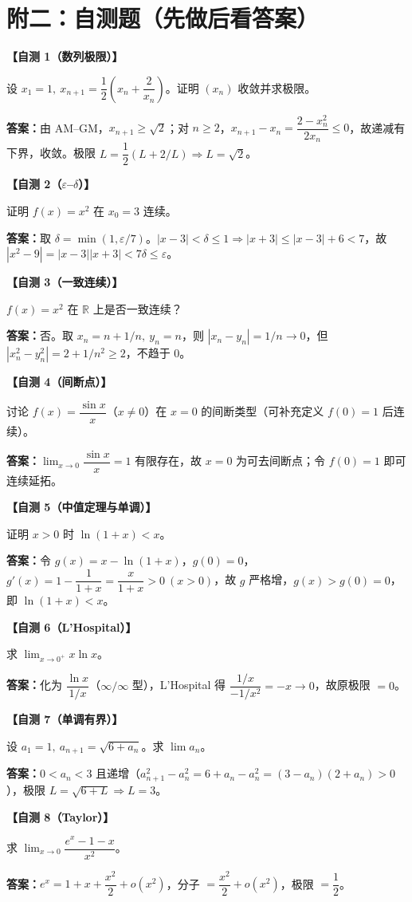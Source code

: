 \documentclass[12pt,a4paper,UTF8]{ctexart}
\newcommand{\R}{\mathbb R}
\newcommand{\eps}{\varepsilon}
\newenvironment{kp}[1]{\par\smallskip\noindent\textbf{【#1】}\par\nobreak\smallskip}{\par\smallskip}
\begin{document}
\newpage
\section*{附二：自测题（先做后看答案）}

\begin{kp}{自测 1（数列极限）}
设 $x_1=1,\ x_{n+1}=\dfrac{1}{2}\left(x_n+\dfrac{2}{x_n}\right)$。证明 $(x_n)$ 收敛并求极限。
\par\medskip
\textbf{答案：}由 AM--GM，$x_{n+1}\ge\sqrt2$；对 $n\ge2$，$x_{n+1}-x_n=\dfrac{2-x_n^2}{2x_n}\le0$，故递减有下界，收敛。极限 $L=\dfrac12(L+2/L)\Rightarrow L=\sqrt2$。
\end{kp}

\begin{kp}{自测 2（$\eps$–$\delta$）}
证明 $f(x)=x^2$ 在 $x_0=3$ 连续。
\par\medskip
\textbf{答案：}取 $\delta=\min(1,\eps/7)$。$|x-3|<\delta\le1\Rightarrow|x+3|\le|x-3|+6<7$，故 $|x^2-9|=|x-3||x+3|<7\delta\le\eps$。
\end{kp}

\begin{kp}{自测 3（一致连续）}
$f(x)=x^2$ 在 $\R$ 上是否一致连续？
\par\medskip
\textbf{答案：}否。取 $x_n=n+1/n,\ y_n=n$，则 $|x_n-y_n|=1/n\to0$，但 $|x_n^2-y_n^2|=2+1/n^2\ge2$，不趋于 0。
\end{kp}

\begin{kp}{自测 4（间断点）}
讨论 $f(x)=\dfrac{\sin x}{x}$（$x\ne0$）在 $x=0$ 的间断类型（可补充定义 $f(0)=1$ 后连续）。
\par\medskip
\textbf{答案：}$\lim_{x\to0}\dfrac{\sin x}{x}=1$ 有限存在，故 $x=0$ 为可去间断点；令 $f(0)=1$ 即可连续延拓。
\end{kp}

\begin{kp}{自测 5（中值定理与单调）}
证明 $x>0$ 时 $\ln(1+x)<x$。
\par\medskip
\textbf{答案：}令 $g(x)=x-\ln(1+x)$，$g(0)=0$，$g'(x)=1-\dfrac{1}{1+x}=\dfrac{x}{1+x}>0\ (x>0)$，故 $g$ 严格增，$g(x)>g(0)=0$，即 $\ln(1+x)<x$。
\end{kp}

\begin{kp}{自测 6（L'Hospital）}
求 $\lim_{x\to0^+}x\ln x$。
\par\medskip
\textbf{答案：}化为 $\dfrac{\ln x}{1/x}$（$\infty/\infty$ 型），L'Hospital 得 $\dfrac{1/x}{-1/x^2}=-x\to0$，故原极限 $=0$。
\end{kp}

\begin{kp}{自测 7（单调有界）}
设 $a_1=1,\ a_{n+1}=\sqrt{6+a_n}$。求 $\lim a_n$。
\par\medskip
\textbf{答案：}$0<a_n<3$ 且递增（$a_{n+1}^2-a_n^2=6+a_n-a_n^2=(3-a_n)(2+a_n)>0$），极限 $L=\sqrt{6+L}\Rightarrow L=3$。
\end{kp}

\begin{kp}{自测 8（Taylor）}
求 $\lim_{x\to0}\dfrac{e^x-1-x}{x^2}$。
\par\medskip
\textbf{答案：}$e^x=1+x+\dfrac{x^2}{2}+o(x^2)$，分子 $=\dfrac{x^2}{2}+o(x^2)$，极限 $=\dfrac12$。
\end{kp}
\end{document}
